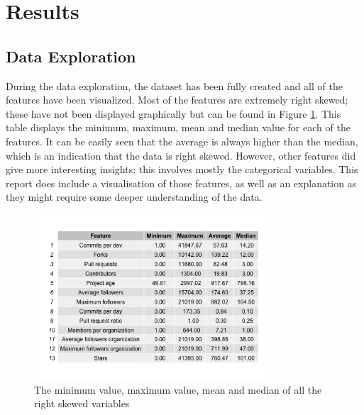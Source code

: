 \section{Results}
    \subsection{Data Exploration}
        During the data exploration, the dataset has been fully created and all of the features have been visualized. 
        Most of the features are extremely right skewed; these have not been displayed graphically but can be found in Figure \ref{fig:right-skewed-features}. This table displays the minimum, maximum, mean and median value for each of the features.
        It can be easily seen that the average is always higher than the median, which is an indication that the data is right skewed.
        However, other features did give more interesting insights; this involves mostly the categorical variables. 
        This report does include a visualisation of those features, as well as an explanation as they might require some deeper understanding of the data.
        
        \begin{figure}[h!]
	        \includegraphics[width=250pt]{figures/data_summary_table}
	        \caption{The minimum value, maximum value, mean and median of all the right skewed variables}
	        \label{fig:right-skewed-features}
	    \end{figure}
        
